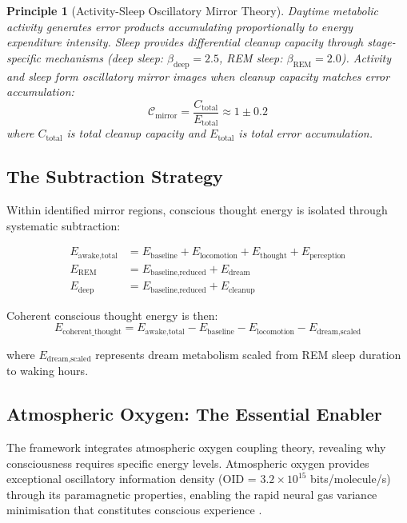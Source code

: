 \documentclass[12pt]{article}
\newtheorem{principle}[theorem]{Principle}
\theoremstyle{remark}
\begin{document}
\begin{principle}[Activity-Sleep Oscillatory Mirror Theory]
Daytime metabolic activity generates error products accumulating proportionally to energy expenditure intensity. Sleep provides differential cleanup capacity through stage-specific mechanisms (deep sleep: $\beta_{\text{deep}} = 2.5$, REM sleep: $\beta_{\text{REM}} = 2.0$). Activity and sleep form oscillatory mirror images when cleanup capacity matches error accumulation:
\begin{equation}
\mathcal{C}_{\text{mirror}} = \frac{C_{\text{total}}}{E_{\text{total}}} \approx 1 \pm 0.2
\end{equation}
where $C_{\text{total}}$ is total cleanup capacity and $E_{\text{total}}$ is total error accumulation.
\end{principle}

\subsection{The Subtraction Strategy}

Within identified mirror regions, conscious thought energy is isolated through systematic subtraction:

\begin{align}
E_{\text{awake,total}} &= E_{\text{baseline}} + E_{\text{locomotion}} + E_{\text{thought}} + E_{\text{perception}} \\
E_{\text{REM}} &= E_{\text{baseline,reduced}} + E_{\text{dream}} \\
E_{\text{deep}} &= E_{\text{baseline,reduced}} + E_{\text{cleanup}}
\end{align}

Coherent conscious thought energy is then:
\begin{equation}
\boxed{E_{\text{coherent\_thought}} = E_{\text{awake,total}} - E_{\text{baseline}} - E_{\text{locomotion}} - E_{\text{dream,scaled}}}
\label{eq:thought_subtraction}
\end{equation}

where $E_{\text{dream,scaled}}$ represents dream metabolism scaled from REM sleep duration to waking hours.

\subsection{Atmospheric Oxygen: The Essential Enabler}

The framework integrates atmospheric oxygen coupling theory, revealing why consciousness requires specific energy levels. Atmospheric oxygen provides exceptional oscillatory information density (OID = $3.2 \times 10^{15}$ bits/molecule/s) through its paramagnetic properties, enabling the rapid neural gas variance minimisation that constitutes conscious experience \citep{sachikonye2025categorical}.
\end{document}
